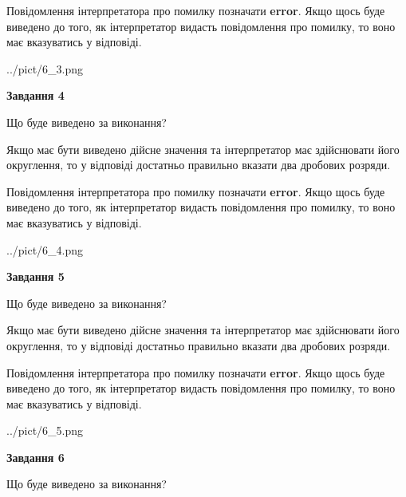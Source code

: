 \documentclass[12pt, ukrainian]{article}
\begin{document}
{\begin {Large}
Повідомлення інтерпретатора про помилку позначати \textbf{error}.
Якщо щось буде виведено до того, як інтерпретатор видасть повідомлення про помилку, 
то воно має вказуватись у відповіді. \par

\begin{center}
	{../pict/6_3.png}
\end{center}
\newpage

{\begin {center}\textbf{Завдання 4}\end {center}}\par
Що буде виведено за виконання? \par

Якщо має бути виведено дійсне значення та інтерпретатор має здійснювати його округлення, 
то у відповіді достатньо правильно вказати два дробових розряди.

Повідомлення інтерпретатора про помилку позначати \textbf{error}.
Якщо щось буде виведено до того, як інтерпретатор видасть повідомлення про помилку, 
то воно має вказуватись у відповіді. \par

\begin{center}
	{../pict/6_4.png}
\end{center}
\newpage

{\begin {center}\textbf{Завдання 5}\end {center}}\par
Що буде виведено за виконання? \par

Якщо має бути виведено дійсне значення та інтерпретатор має здійснювати його округлення, 
то у відповіді достатньо правильно вказати два дробових розряди.

Повідомлення інтерпретатора про помилку позначати \textbf{error}.
Якщо щось буде виведено до того, як інтерпретатор видасть повідомлення про помилку, 
то воно має вказуватись у відповіді. \par

\begin{center}
	{../pict/6_5.png}
\end{center}
\newpage

{\begin {center}\textbf{Завдання 6}\end {center}}\par
Що буде виведено за виконання? \par


\end{Large}}
\end{document}
